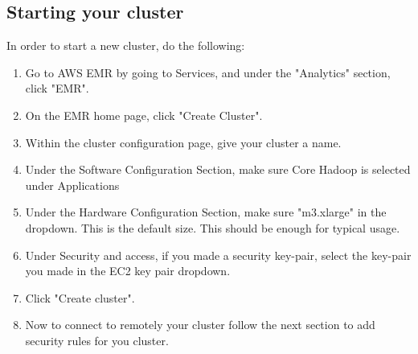 \documentclass{article}
\begin{document}
\subsection{Starting your cluster}
In order to start a new cluster, do the following:
\begin{enumerate}
    \item Go to AWS EMR by going to Services,  and under the "Analytics" section, click "EMR".
    \item On the EMR home page, click "Create Cluster".
    \item Within the cluster configuration page, give your cluster a name.
    \item Under the Software Configuration Section, make sure Core Hadoop is selected under Applications
    \item Under the Hardware Configuration Section, make sure "m3.xlarge" in the dropdown. This is the default size. This should be enough for typical usage.
    \item Under Security and access, if you made a security key-pair, select the key-pair you made in the EC2 key pair dropdown.
    \item Click "Create cluster".
    \item Now to connect to remotely your cluster follow the next section to add security rules for you cluster. 
\end{enumerate}
\end{document}
